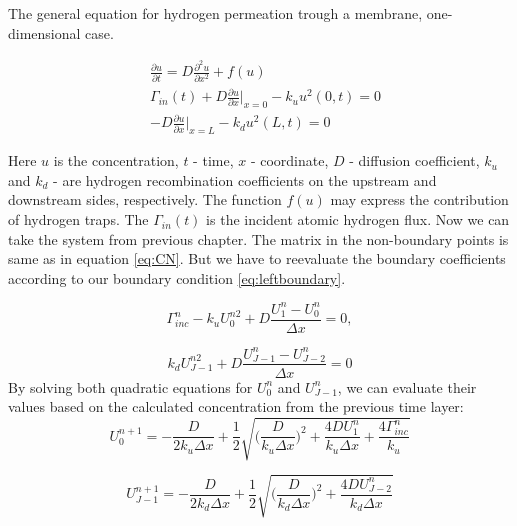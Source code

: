\documentclass[../summary.tex]{subfiles}
\begin{document}
The general equation for hydrogen permeation trough a membrane, one-dimensional case.

\begin{align}
        &\frac{\partial u}{\partial t} = D \frac{\partial^2 u}{\partial x^2} + f(u) \label{eq:diff}\\
        &\Gamma_{in}(t) + D\frac{\partial u}{\partial x}\big|_{x = 0} - k_{u}u^{2}(0,t) = 0\label{eq:leftboundary}\\
        &-D\frac{\partial u}{\partial x}\big|_{x =L} - k_{d}u^{2}(L,t) = 0\label{eq:rightboundary}
\end{align}

Here $u$ is the concentration, $t$ - time, $x$ - coordinate, $D$ - diffusion coefficient, $k_u$ and $k_d$ - are hydrogen recombination coefficients on the upstream and downstream sides, respectively. The function $f(u)$ may express the contribution of hydrogen traps. The $\Gamma_{in}(t)$ is the incident atomic hydrogen flux.
Now we can take the system from previous chapter.
The matrix in the non-boundary points is same as in equation \ref{eq:CN}. But we have to reevaluate the boundary coefficients according to our boundary condition \ref{eq:leftboundary}.

\begin{equation}
    \Gamma_{inc}^n - k_u U_0^{n2} + D\frac{U_1^n - U_0^n}{\Delta x} = 0,
\end{equation}

\begin{equation}
    k_d U_{J-1}^{n2} + D\frac{U_{J-1}^n - U_{J-2}^n}{\Delta x} = 0
\end{equation}
By solving both quadratic equations for $U_0^n$ and $U_{J-1}^n$, we can evaluate their values based on the calculated concentration from the previous time layer:
\begin{equation}
    U_0^{n+1} = -\frac{D}{2k_u\Delta x} + \frac{1}{2} \sqrt{\Big(\frac{D}{k_u \Delta x}\Big)^2 + \frac{4DU_1^n}{k_u \Delta x} + \frac{4\Gamma_{inc}^n}{k_u}}
    \end{equation}

\begin{equation}
    U_{J-1}^{n+1} = -\frac{D}{2k_d\Delta x} + \frac{1}{2} \sqrt{\Big(\frac{D}{k_d \Delta x}\Big)^2 + \frac{4DU_{J-2}^n}{k_d \Delta x}}
\end{equation}
\end{document}
